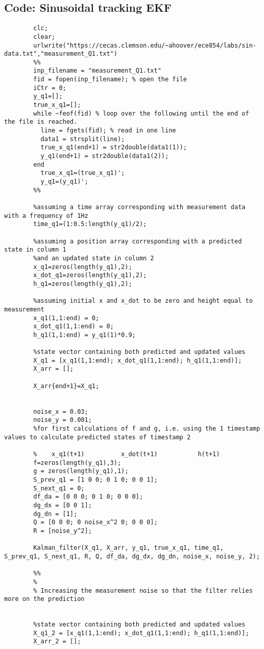 \documentclass{article}
\begin{document}
	\subsection{Code: Sinusoidal tracking EKF}
	\begin{verbatim}
		clc;
		clear;
		urlwrite("https://cecas.clemson.edu/~ahoover/ece854/labs/sin-data.txt","measurement_Q1.txt")
		%%
		inp_filename = "measurement_Q1.txt"
		fid = fopen(inp_filename); % open the file
		iCtr = 0;
		y_q1=[];
		true_x_q1=[];
		while ~feof(fid) % loop over the following until the end of the file is reached.
		  line = fgets(fid); % read in one line
		  data1 = strsplit(line);
		  true_x_q1(end+1) = str2double(data1(1));
		  y_q1(end+1) = str2double(data1(2));
		end
		  true_x_q1=(true_x_q1)';
		  y_q1=(y_q1)';
		%%
		
		%assuming a time array corresponding with measurement data with a frequency of 1Hz
		time_q1=(1:0.5:length(y_q1)/2);
		
		%assuming a position array corresponding with a predicted state in column 1
		%and an updated state in column 2
		x_q1=zeros(length(y_q1),2);
		x_dot_q1=zeros(length(y_q1),2);
		h_q1=zeros(length(y_q1),2);
		
		%assuming initial x and x_dot to be zero and height equal to measurement
		x_q1(1,1:end) = 0;
		x_dot_q1(1,1:end) = 0;
		h_q1(1,1:end) = y_q1(1)*0.9;
		
		%state vector containing both predicted and updated values
		X_q1 = [x_q1(1,1:end); x_dot_q1(1,1:end); h_q1(1,1:end)];
		X_arr = [];
		
		X_arr{end+1}=X_q1;
		
		
		noise_x = 0.03;
		noise_y = 0.001;
		%for first calculations of f and g, i.e. using the 1 timestamp values to calculate predicted states of timestamp 2
		
		%    x_q1(t+1)          x_dot(t+1)           h(t+1)
		f=zeros(length(y_q1),3);
		g = zeros(length(y_q1),1);
		S_prev_q1 = [1 0 0; 0 1 0; 0 0 1];
		S_next_q1 = 0;
		df_da = [0 0 0; 0 1 0; 0 0 0];
		dg_dx = [0 0 1];
		dg_dn = [1];
		Q = [0 0 0; 0 noise_x^2 0; 0 0 0];
		R = [noise_y^2];
		
		Kalman_filter(X_q1, X_arr, y_q1, true_x_q1, time_q1, S_prev_q1, S_next_q1, R, Q, df_da, dg_dx, dg_dn, noise_x, noise_y, 2);
		
		%% 
		% 
		% Increasing the measurement noise so that the filter relies more on the prediction
		
		
		%state vector containing both predicted and updated values
		X_q1_2 = [x_q1(1,1:end); x_dot_q1(1,1:end); h_q1(1,1:end)];
		X_arr_2 = [];
		

\end{verbatim}
\end{document}
